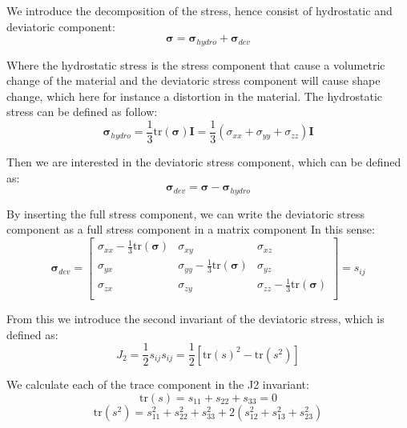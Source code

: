\documentclass[12pt]{article}
\begin{document}
We introduce the decomposition of the stress, hence consist of hydrostatic and deviatoric component:
\begin{equation}
\boldsymbol{\sigma} = \boldsymbol{\sigma}_{hydro} + \boldsymbol{\sigma}_{dev}
\end{equation}

Where the hydrostatic stress is the stress component that cause a volumetric change of the material and 
the deviatoric stress component will cause shape change, which here for instance a distortion in the material. The
hydrostatic stress can be defined as follow:
\begin{equation}
\boldsymbol{\sigma}_{hydro} = \frac{1}{3} \text{tr}(\boldsymbol{\sigma}) \boldsymbol{I} = \frac{1}{3} \left( \sigma_{xx} + \sigma_{yy} + \sigma_{zz} \right) \boldsymbol{I}
\end{equation}

Then we are interested in the deviatoric stress component, which can be defined as:
\begin{equation}
\boldsymbol{\sigma}_{dev} = \boldsymbol{\sigma} - \boldsymbol{\sigma}_{hydro}
\end{equation}

By inserting the full stress component, we can write the deviatoric stress component as a full stress component in a matrix component
In this sense:
\begin{equation}
\boldsymbol{\sigma}_{dev} =
    \begin{bmatrix}
    \sigma_{xx} - \frac{1}{3}\text{tr}(\boldsymbol{\sigma}) & \sigma_{xy} & \sigma_{xz} \\
    \sigma_{yx} & \sigma_{yy} - \frac{1}{3}\text{tr}(\boldsymbol{\sigma}) & \sigma_{yz} \\
    \sigma_{zx} & \sigma_{zy} & \sigma_{zz} - \frac{1}{3}\text{tr}(\boldsymbol{\sigma}) \\
    \end{bmatrix}
    = s_{ij}
\end{equation}

From this we introduce the second invariant of the deviatoric stress, which is defined as:
\begin{equation}
J_2 = \frac{1}{2}s_{ij}s_{ij} = \frac{1}{2}[\text{tr}(s)^2-\text{tr}(s^2)]
\end{equation}

We calculate each of the trace component in the J2 invariant:
\begin{equation}
\text{tr}(s) = s_{11} + s_{22} + s_{33} = 0
\end{equation}
\begin{equation}
\text{tr}(s^2) = s_{11}^2 + s_{22}^2 + s_{33}^2 + 2(s_{12}^2 + s_{13}^2 + s_{23}^2)
\end{equation}
\end{document}
